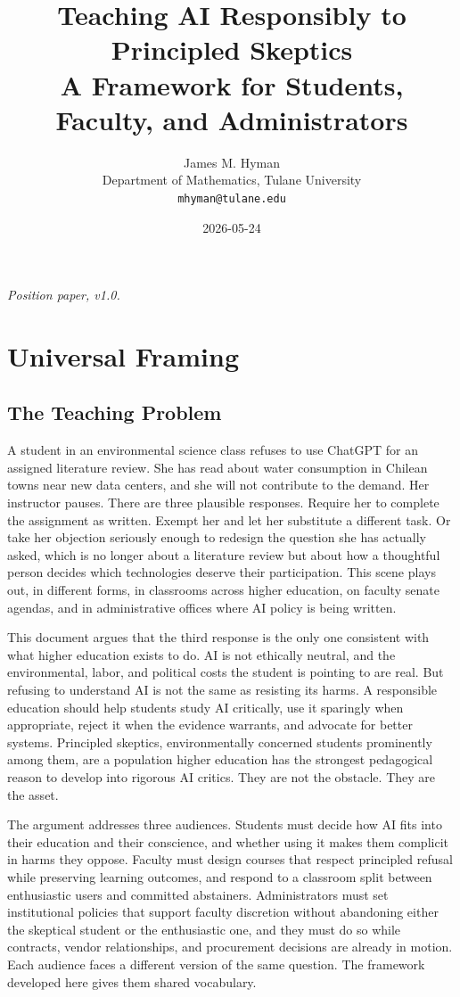 \documentclass[12pt]{article}
\title{\textbf{Teaching AI Responsibly to Principled Skeptics}\\[0.3em]
  \large A Framework for Students, Faculty, and Administrators}
\author{James M. Hyman\\
  \small Department of Mathematics, Tulane University\\
  \small \texttt{mhyman@tulane.edu}}
\date{2026-05-24}
\begin{document}
\maketitle

\noindent\textit{Position paper, v1.0.}

\bigskip

\section{Universal Framing}
\label{sec:part1}

\subsection{The Teaching Problem}
\label{sec:I.1}

A student in an environmental science class refuses to use ChatGPT for an assigned literature review. She has read about water consumption in Chilean towns near new data centers, and she will not contribute to the demand. Her instructor pauses. There are three plausible responses. Require her to complete the assignment as written. Exempt her and let her substitute a different task. Or take her objection seriously enough to redesign the question she has actually asked, which is no longer about a literature review but about how a thoughtful person decides which technologies deserve their participation. This scene plays out, in different forms, in classrooms across higher education, on faculty senate agendas, and in administrative offices where AI policy is being written.

This document argues that the third response is the only one consistent with what higher education exists to do. AI is not ethically neutral, and the environmental, labor, and political costs the student is pointing to are real. But refusing to understand AI is not the same as resisting its harms. A responsible education should help students study AI critically, use it sparingly when appropriate, reject it when the evidence warrants, and advocate for better systems. Principled skeptics, environmentally concerned students prominently among them, are a population higher education has the strongest pedagogical reason to develop into rigorous AI critics. They are not the obstacle. They are the asset.

The argument addresses three audiences. Students must decide how AI fits into their education and their conscience, and whether using it makes them complicit in harms they oppose. Faculty must design courses that respect principled refusal while preserving learning outcomes, and respond to a classroom split between enthusiastic users and committed abstainers. Administrators must set institutional policies that support faculty discretion without abandoning either the skeptical student or the enthusiastic one, and they must do so while contracts, vendor relationships, and procurement decisions are already in motion. Each audience faces a different version of the same question. The framework developed here gives them shared vocabulary.
\end{document}
